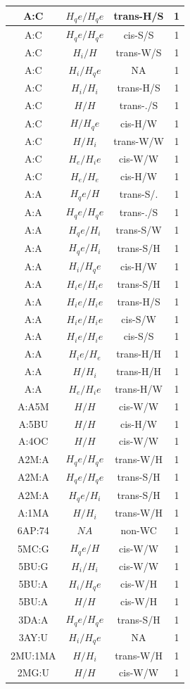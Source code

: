 \begin{center}
\begin{longtable}{c|c|c|c}
A:C & $H_qe/H_qe$ & trans-H/S & 1 \\  \hline
A:C & $H_qe/H_qe$ & cis-S/S & 1 \\  \hline
A:C & $H_i/H$ & trans-W/S & 1 \\  \hline
A:C & $H_i/H_qe$ & NA & 1 \\  \hline
A:C & $H_i/H_i$ & trans-H/S & 1 \\  \hline
A:C & $H/H$ & trans-./S & 1 \\  \hline
A:C & $H/H_qe$ & cis-H/W & 1 \\  \hline
A:C & $H/H_i$ & trans-W/W & 1 \\  \hline
A:C & $H_e/H_ie$ & cis-W/W & 1 \\  \hline
A:C & $H_e/H_e$ & cis-H/W & 1 \\  \hline
A:A & $H_qe/H$ & trans-S/. & 1 \\  \hline
A:A & $H_qe/H_qe$ & trans-./S & 1 \\  \hline
A:A & $H_qe/H_i$ & trans-S/W & 1 \\  \hline
A:A & $H_qe/H_i$ & trans-S/H & 1 \\  \hline
A:A & $H_i/H_qe$ & cis-H/W & 1 \\  \hline
A:A & $H_ie/H_ie$ & trans-S/H & 1 \\  \hline
A:A & $H_ie/H_ie$ & trans-H/S & 1 \\  \hline
A:A & $H_ie/H_ie$ & cis-S/W & 1 \\  \hline
A:A & $H_ie/H_ie$ & cis-S/S & 1 \\  \hline
A:A & $H_ie/H_e$ & trans-H/H & 1 \\  \hline
A:A & $H/H_i$ & trans-H/H & 1 \\  \hline
A:A & $H_e/H_ie$ & trans-H/W & 1 \\  \hline
A:A5M & $H/H$ & cis-W/W & 1 \\  \hline
A:5BU & $H/H$ & cis-H/W & 1 \\  \hline
A:4OC & $H/H$ & cis-W/W & 1 \\  \hline
A2M:A & $H_qe/H_qe$ & trans-W/H & 1 \\  \hline
A2M:A & $H_qe/H_qe$ & trans-S/H & 1 \\  \hline
A2M:A & $H_qe/H_i$ & trans-S/H & 1 \\  \hline
A:1MA & $H/H_i$ & trans-W/H & 1 \\  \hline
6AP:74 & $NA$ & non-WC & 1 \\  \hline
5MC:G & $H_qe/H$ & cis-W/W & 1 \\  \hline
5BU:G & $H_i/H_i$ & cis-W/W & 1 \\  \hline
5BU:A & $H_i/H_qe$ & cis-W/H & 1 \\  \hline
5BU:A & $H/H$ & cis-W/H & 1 \\  \hline
3DA:A & $H_qe/H_qe$ & trans-S/H & 1 \\  \hline
3AY:U & $H_i/H_qe$ & NA & 1 \\  \hline
2MU:1MA & $H/H_i$ & trans-W/H & 1 \\  \hline
2MG:U & $H/H$ & cis-W/W & 1 \\  \hline
\end{longtable}
\end{center}
